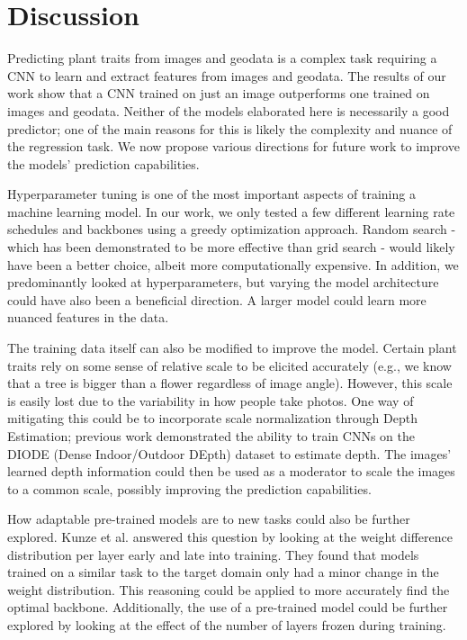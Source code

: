 \documentclass[12pt,a4paper,oneside]{article}
\begin{document}
\section{Discussion}

Predicting plant traits from images and geodata is a complex task requiring a CNN to learn and extract features from images and geodata. The results of our work show that a CNN trained on just an image outperforms one trained on images and geodata. Neither of the models elaborated here is necessarily a good predictor; one of the main reasons for this is likely the complexity and nuance of the regression task. We now propose various directions for future work to improve the models' prediction capabilities.

Hyperparameter tuning is one of the most important aspects of training a machine learning model. In our work, we only tested a few different learning rate schedules and backbones using a greedy optimization approach. Random search - which has been demonstrated to be more effective than grid search \cite{JMLR:v13:bergstra12a} - would likely have been a better choice, albeit more computationally expensive. In addition, we predominantly looked at hyperparameters, but varying the model architecture could have also been a beneficial direction. A larger model could learn more nuanced features in the data. 

The training data itself can also be modified to improve the model. Certain plant traits rely on some sense of relative scale to be elicited accurately (e.g., we know that a tree is bigger than a flower regardless of image angle). However, this scale is easily lost due to the variability in how people take photos. One way of mitigating this could be to incorporate scale normalization through Depth Estimation; previous work \cite{Ummenhofer_2017} demonstrated the ability to train CNNs on the DIODE (Dense Indoor/Outdoor DEpth) \cite{vasiljevic2019diode} dataset to estimate depth. The images' learned depth information could then be used as a moderator to scale the images to a common scale, possibly improving the prediction capabilities.

How adaptable pre-trained models are to new tasks could also be further explored. Kunze et al. \cite{kunze2017transfer} answered this question by looking at the weight difference distribution per layer early and late into training. They found that models trained on a similar task to the target domain only had a minor change in the weight distribution. This reasoning could be applied to more accurately find the optimal backbone. Additionally, the use of a pre-trained model could be further explored by looking at the effect of the number of layers frozen during training. 
\end{document}
